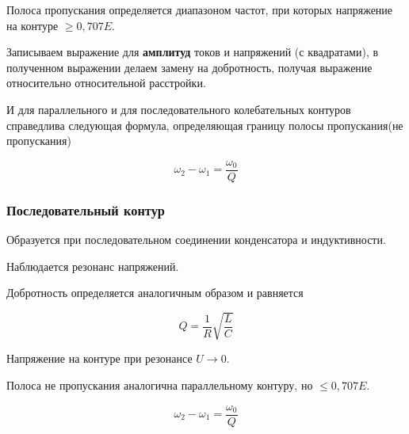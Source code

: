Полоса пропускания определяется диапазоном частот, при которых напряжение на контуре $\geq 0,707 E$.

Записываем выражение для \textbf{амплитуд} токов и напряжений (с квадратами), в полученном выражении делаем замену на добротность, получая выражение относительно относительной расстройки.

И для параллельного и для последовательного колебательных контуров справедлива следующая формула, определяющая границу полосы пропускания(не пропускания)

\begin{equation}
\omega_2 - \omega_1 = \frac{\omega_0}{Q}
\end{equation}

\subsubsection{Последовательный контур}

Образуется при последовательном соединении конденсатора и индуктивности.

Наблюдается резонанс напряжений.

Добротность определяется аналогичным образом и равняется 

\begin{equation}
Q = \frac{1}{R} \sqrt{\frac{L}{C}}
\end{equation}

Напряжение на контуре при резонансе $ U \rightarrow 0$.

Полоса не пропускания аналогична параллельному контуру, но $\leq 0,707 E$.

\begin{equation}
\omega_2 - \omega_1 = \frac{\omega_0}{Q}
\end{equation}

\pagebreak